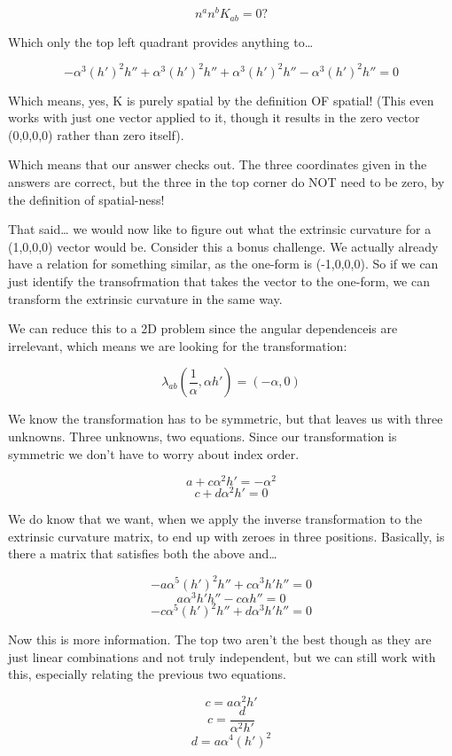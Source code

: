 \documentclass[landscape,letterpaper,10pt,english]{article}
\begin{document}
\[ n^an^bK_{ab} = 0? \]

Which only the top left quadrant provides anything to\ldots{}

\[-\alpha^3 (h')^2h'' + \alpha^3 (h')^2 h'' + \alpha^3 (h')^2 h'' - \alpha^3 (h')^2 h'' = 0\]

Which means, yes, K is purely spatial by the definition OF spatial!
(This even works with just one vector applied to it, though it results
in the zero vector (0,0,0,0) rather than zero itself).

Which means that our answer checks out. The three coordinates given in
the answers are correct, but the three in the top corner do NOT need to
be zero, by the definition of spatial-ness!

That said\ldots{} we would now like to figure out what the extrinsic
curvature for a (1,0,0,0) vector would be. Consider this a bonus
challenge. We actually already have a relation for something similar, as
the one-form is (-1,0,0,0). So if we can just identify the
transofrmation that takes the vector to the one-form, we can transform
the extrinsic curvature in the same way.

We can reduce this to a 2D problem since the angular dependenceis are
irrelevant, which means we are looking for the transformation:

\[ \lambda_{ab}(\frac1\alpha, \alpha h') = (-\alpha, 0) \]

We know the transformation has to be symmetric, but that leaves us with
three unknowns. Three unknowns, two equations. Since our transformation
is symmetric we don't have to worry about index order.

    \[ a + c \alpha^2 h' = -\alpha^2 \] \[ c + d \alpha^2 h' = 0 \]

We do know that we want, when we apply the inverse transformation to the
extrinsic curvature matrix, to end up with zeroes in three positions.
Basically, is there a matrix that satisfies both the above and\ldots{}

\[ -a \alpha^5 (h')^2 h'' + c \alpha^3 h' h'' = 0 \]
\[ a \alpha^3 h' h'' - c \alpha h'' = 0 \]
\[ -c \alpha^5 (h')^2 h'' + d \alpha^3 h' h'' = 0 \]

Now this is more information. The top two aren't the best though as they
are just linear combinations and not truly independent, but we can still
work with this, especially relating the previous two equations.

\[ c = a\alpha^2 h' \] \[ c = \frac{d}{\alpha^2 h'}\]
\[ d = a\alpha^4 (h')^2 \]
\end{document}
